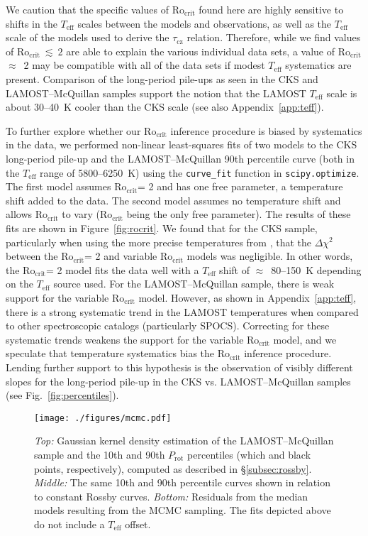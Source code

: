 \documentclass[linenumbers,tighten,trackchanges,twocolumn]{aastex631}
\newcommand{\taucz}{$\tau_\mathrm{cz}$\xspace}
\newcommand{\rocrit}{$\mathrm{Ro_{crit}}$\xspace}
\newcommand{\rocritfinal}{$\mathrm{Ro_{crit}}~\lesssim~2$\xspace}
\newcommand{\lamostmcq}{LAMOST--McQuillan\xspace}
\newcommand{\teff}{\ensuremath{T_{\mathrm{eff}}}\xspace}
\newcommand{\prot}{\ensuremath{P_\mathrm{rot}}\xspace}
\begin{document}
We caution that the specific values of \rocrit found here are highly sensitive to shifts in the \teff scales between the models and observations, as well as the \teff scale of the models used to derive the \taucz relation. Therefore, while we find values of \rocritfinal are able to explain the various individual data sets, a value of \rocrit  $\approx$~2 may be compatible with all of the data sets if modest \teff systematics are present. Comparison of the long-period pile-ups as seen in the CKS and \lamostmcq samples support the notion that the LAMOST \teff scale is about 30--40~K cooler than the CKS scale (see also Appendix~\ref{app:teff}).

{\color{red} To further explore whether our \rocrit inference procedure is biased by systematics in the data, we performed non-linear least-squares fits of two models to the CKS long-period pile-up and the \lamostmcq 90th percentile curve (both in the \teff range of 5800--6250~K) using the \texttt{curve\_fit} function in \texttt{scipy.optimize}. The first model assumes \rocrit = 2 and has one free parameter, a temperature shift added to the data. The second model assumes no temperature shift and allows \rocrit to vary (\rocrit being the only free parameter). The results of these fits are shown in Figure~\ref{fig:rocrit}. We found that for the CKS sample, particularly when using the more precise temperatures from \citet{Fulton2018}, that the $\Delta \chi^2$ between the \rocrit = 2 and variable \rocrit models was negligible. In other words, the \rocrit = 2 model fits the data well with a \teff shift of $\approx$~80--150~K depending on the \teff source used. For the \lamostmcq sample, there is weak support for the variable \rocrit model. However, as shown in Appendix~\ref{app:teff}, there is a strong systematic trend in the LAMOST temperatures when compared to other spectroscopic catalogs (particularly SPOCS). Correcting for these systematic trends weakens the support for the variable \rocrit model, and we speculate that temperature systematics bias the \rocrit inference procedure. Lending further support to this hypothesis is the observation of visibly different slopes for the long-period pile-up in the CKS vs. \lamostmcq samples (see Fig.~\ref{fig:percentiles}).}


\begin{figure}
    \centering
    \texttt{[image: ./figures/mcmc.pdf]}
    \caption{\textit{Top:} Gaussian kernel density estimation of the LAMOST--McQuillan sample and the 10th and 90th \prot percentiles (which and black points, respectively), computed as described in \S\ref{subsec:rossby}. \textit{Middle:} The same 10th and 90th percentile curves shown in relation to constant Rossby curves. \textit{Bottom:} Residuals from the median models resulting from the MCMC sampling. The fits depicted above do not include a \teff offset.}
    \label{fig:mcmc}
\end{figure}
\end{document}
